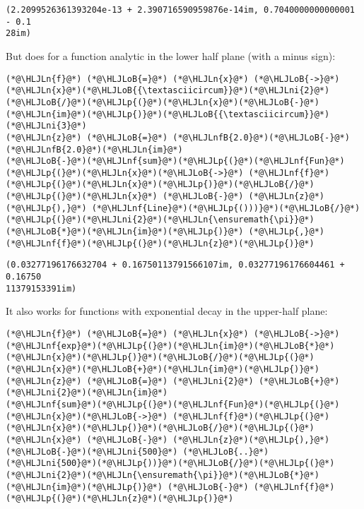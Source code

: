 \documentclass[12pt,a4paper]{article}
\newcommand{\HLJLn}[1]{#1}
\newcommand{\HLJLnf}[1]{\textcolor[RGB]{66,102,213}{#1}}
\newcommand{\HLJLnfB}[1]{\textcolor[RGB]{59,151,46}{#1}}
\newcommand{\HLJLni}[1]{\textcolor[RGB]{59,151,46}{#1}}
\newcommand{\HLJLoB}[1]{\textcolor[RGB]{102,102,102}{\textbf{#1}}}
\newcommand{\HLJLp}[1]{#1}
\begin{document}
\begin{lstlisting}
(2.2099526361393204e-13 + 2.390716590959876e-14im, 0.7040000000000001 - 0.1
28im)
\end{lstlisting}


But does for a function analytic in the lower half plane (with a minus sign):


\begin{lstlisting}
(*@\HLJLn{f}@*) (*@\HLJLoB{=}@*) (*@\HLJLn{x}@*) (*@\HLJLoB{->}@*) (*@\HLJLn{x}@*)(*@\HLJLoB{{\textasciicircum}}@*)(*@\HLJLni{2}@*)(*@\HLJLoB{/}@*)(*@\HLJLp{(}@*)(*@\HLJLn{x}@*)(*@\HLJLoB{-}@*)(*@\HLJLn{im}@*)(*@\HLJLp{)}@*)(*@\HLJLoB{{\textasciicircum}}@*)(*@\HLJLni{3}@*)
(*@\HLJLn{z}@*) (*@\HLJLoB{=}@*) (*@\HLJLnfB{2.0}@*)(*@\HLJLoB{-}@*)(*@\HLJLnfB{2.0}@*)(*@\HLJLn{im}@*)
(*@\HLJLoB{-}@*)(*@\HLJLnf{sum}@*)(*@\HLJLp{(}@*)(*@\HLJLnf{Fun}@*)(*@\HLJLp{(}@*)(*@\HLJLn{x}@*)(*@\HLJLoB{->}@*) (*@\HLJLnf{f}@*)(*@\HLJLp{(}@*)(*@\HLJLn{x}@*)(*@\HLJLp{)}@*)(*@\HLJLoB{/}@*)(*@\HLJLp{(}@*)(*@\HLJLn{x}@*) (*@\HLJLoB{-}@*) (*@\HLJLn{z}@*)(*@\HLJLp{),}@*) (*@\HLJLnf{Line}@*)(*@\HLJLp{()))}@*)(*@\HLJLoB{/}@*)(*@\HLJLp{(}@*)(*@\HLJLni{2}@*)(*@\HLJLn{\ensuremath{\pi}}@*)(*@\HLJLoB{*}@*)(*@\HLJLn{im}@*)(*@\HLJLp{)}@*) (*@\HLJLp{,}@*) (*@\HLJLnf{f}@*)(*@\HLJLp{(}@*)(*@\HLJLn{z}@*)(*@\HLJLp{)}@*)
\end{lstlisting}

\begin{lstlisting}
(0.03277196176632704 + 0.16750113791566107im, 0.03277196176604461 + 0.16750
11379153391im)
\end{lstlisting}


It also works for functions with exponential decay in the upper-half plane:


\begin{lstlisting}
(*@\HLJLn{f}@*) (*@\HLJLoB{=}@*) (*@\HLJLn{x}@*) (*@\HLJLoB{->}@*) (*@\HLJLnf{exp}@*)(*@\HLJLp{(}@*)(*@\HLJLn{im}@*)(*@\HLJLoB{*}@*)(*@\HLJLn{x}@*)(*@\HLJLp{)}@*)(*@\HLJLoB{/}@*)(*@\HLJLp{(}@*)(*@\HLJLn{x}@*)(*@\HLJLoB{+}@*)(*@\HLJLn{im}@*)(*@\HLJLp{)}@*)
(*@\HLJLn{z}@*) (*@\HLJLoB{=}@*) (*@\HLJLni{2}@*) (*@\HLJLoB{+}@*) (*@\HLJLni{2}@*)(*@\HLJLn{im}@*)
(*@\HLJLnf{sum}@*)(*@\HLJLp{(}@*)(*@\HLJLnf{Fun}@*)(*@\HLJLp{(}@*)(*@\HLJLn{x}@*)(*@\HLJLoB{->}@*) (*@\HLJLnf{f}@*)(*@\HLJLp{(}@*)(*@\HLJLn{x}@*)(*@\HLJLp{)}@*)(*@\HLJLoB{/}@*)(*@\HLJLp{(}@*)(*@\HLJLn{x}@*) (*@\HLJLoB{-}@*) (*@\HLJLn{z}@*)(*@\HLJLp{),}@*) (*@\HLJLoB{-}@*)(*@\HLJLni{500}@*) (*@\HLJLoB{..}@*) (*@\HLJLni{500}@*)(*@\HLJLp{))}@*)(*@\HLJLoB{/}@*)(*@\HLJLp{(}@*)(*@\HLJLni{2}@*)(*@\HLJLn{\ensuremath{\pi}}@*)(*@\HLJLoB{*}@*)(*@\HLJLn{im}@*)(*@\HLJLp{)}@*) (*@\HLJLoB{-}@*) (*@\HLJLnf{f}@*)(*@\HLJLp{(}@*)(*@\HLJLn{z}@*)(*@\HLJLp{)}@*)
\end{lstlisting}
\end{document}

